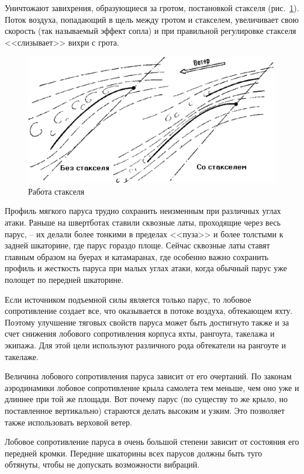 \documentclass[a4paper, 12pt, twoside, final]{scrbook}
\begin{document}
Уничтожают завихрения, образующиеся за гротом, постановкой стакселя (рис.~\ref{fig:97}). Поток воздуха, попадающий в щель между гротом и стакселем, увеличивает свою скорость (так называемый эффект сопла) и при правильной регулировке стакселя <<слизывает>> вихри с грота.

\begin{figure}[htbp]
   \centering
   \includegraphics{97_Rabota_stakselja} %
   \caption{Работа стакселя}
   \label{fig:97}
\end{figure}

Профиль мягкого паруса трудно сохранить неизменным при различных углах атаки. Раньше на швертботах ставили сквозные латы, проходящие через весь парус, \--- их делали более тонкими в пределах <<пуза>> и более толстыми к задней шкаторине, где парус гораздо площе. Сейчас сквозные латы ставят главным образом на буерах и катамаранах, где особенно важно сохранить профиль и жесткость паруса при малых углах атаки, когда обычный парус уже полощет по передней шкаторине.

Если источником подъемной силы является только парус, то лобовое сопротивление создает все, что оказывается в потоке воздуха, обтекающем яхту. Поэтому улучшение тяговых свойств паруса может быть достигнуто также и за счет снижения лобового сопротивления корпуса яхты, рангоута, такелажа и экипажа. Для этой цели используют различного рода обтекатели на рангоуте и такелаже.

Величина лобового сопротивления паруса зависит от его очертаний. По законам аэродинамики лобовое сопротивление крыла самолета тем меньше, чем оно уже и длиннее при той же площади. Вот почему парус (по существу то же крыло, но поставленное вертикально) стараются делать высоким и узким. Это позволяет также использовать верховой ветер.

Лобовое сопротивление паруса в очень большой степени зависит от состояния его передней кромки. Передние шкаторины всех парусов должны быть туго обтянуты, чтобы не допускать возможности вибраций.
\end{document}
